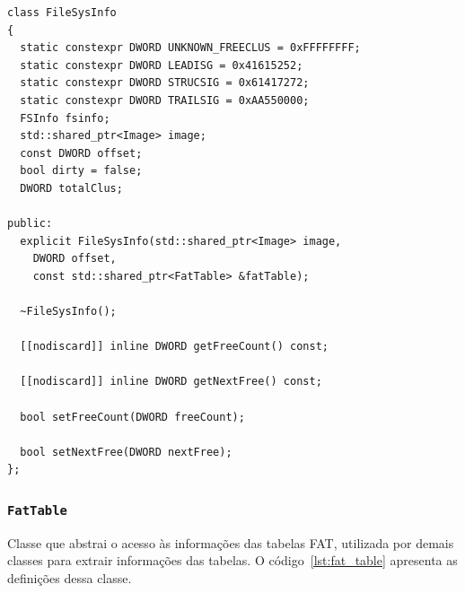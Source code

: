 \documentclass[
    12pt,				%
    oneside,   	        %
    a4paper,			%
    english,			%
    french,				%
    spanish,			%
    brazil,				%
    ]{pacotes/abntex2}
\begin{document}
\begin{lstlisting}[caption={Classe que abstrai a extração de informações da estrutura FSInfo}, label={lst:fileinfo}]
class FileSysInfo
{
  static constexpr DWORD UNKNOWN_FREECLUS = 0xFFFFFFFF;
  static constexpr DWORD LEADISG = 0x41615252;
  static constexpr DWORD STRUCSIG = 0x61417272;
  static constexpr DWORD TRAILSIG = 0xAA550000;
  FSInfo fsinfo;
  std::shared_ptr<Image> image;
  const DWORD offset;
  bool dirty = false;
  DWORD totalClus;

public:
  explicit FileSysInfo(std::shared_ptr<Image> image,
    DWORD offset,
    const std::shared_ptr<FatTable> &fatTable);

  ~FileSysInfo();
  
  [[nodiscard]] inline DWORD getFreeCount() const;

  [[nodiscard]] inline DWORD getNextFree() const;

  bool setFreeCount(DWORD freeCount);

  bool setNextFree(DWORD nextFree);
};
\end{lstlisting}

\subsubsection{\texttt{FatTable}}
\label{subsubsec:fat_table}

Classe que abstrai o acesso às informações das tabelas FAT, utilizada por demais classes para extrair informações das tabelas. O código~\ref{lst:fat_table} apresenta as definições dessa classe. 
\end{document}
